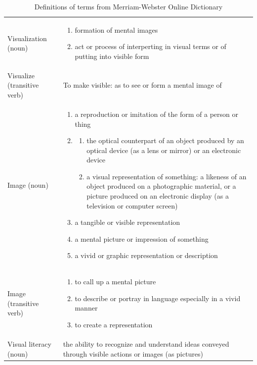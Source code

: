 \begin{table}[htbp]
\centering
\begin{tabular}{l p{10cm}}

Visualization (noun) &

\begin{enumerate}[leftmargin=*]
\item formation of mental images
\item act or process of interperting in visual terms or of putting into visible form
\end{enumerate}
\\[4ex]


Visualize (transitive verb) & 
To make visible: as to see or form a mental image of
\\[4ex]


Image (noun) &
\begin{enumerate}[leftmargin=*]
\item a reproduction or imitation of the form of a person or thing
\item
    \begin{enumerate}
    \item the optical counterpart of an object produced by an optical device (as a lens or mirror) or an electronic device
    \item a visual representation of something: a likeness of an object produced on a photographic material, or a picture produced on an electronic display (as a television or computer screen)
    \end{enumerate}
\item a tangible or visible representation
\item a mental picture or impression of something
\item a vivid or graphic representation or description
\end{enumerate}
\\[4ex]

Image (transitive verb) & 
\begin{enumerate}[leftmargin=*]
\item to call up a mental picture
\item to describe or portray in language especially in a vivid manner
\item to create a representation
\end{enumerate}
\\[4ex]


Visual literacy (noun) &
the ability to recognize and understand ideas conveyed through visible actions or images (as pictures)

\end{tabular}
\caption[
Definitions of terms from Merriam-Webster Online Dictionary, Urldate: 07.2016 
    \newline\small\texttt{\url{http://www.merriam-webster.com/}}
]{Definitions of terms from Merriam-Webster Online Dictionary}
\label{tab:meriam-dict}
\end{table}

